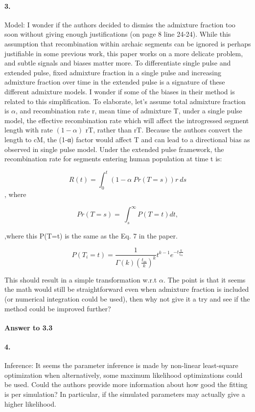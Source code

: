 \documentclass[11pt]{article}
\let\oldparagraph\paragraph
\renewcommand{\paragraph}[1]{\oldparagraph{#1}\mbox{}}
\begin{document}
\paragraph{3.}
Model: I wonder if the authors decided to dismiss the admixture fraction too soon without giving enough justifications (on page 8 line 24-24). While this assumption that recombination within archaic segments can be ignored is perhaps justifiable in some previous work, this paper works on a more delicate problem, and subtle signals and biases matter more. To differentiate single pulse and extended pulse, fixed admixture fraction in a single pulse and increasing admixture fraction over time in the extended pulse is a signature of these different admixture models. I wonder if some of the biases in their method is related to this simplification. To elaborate, let’s assume total admixture fraction is $\alpha$, and recombination rate r, mean time of admixture T, under a single pulse model, the effective recombination rate which will affect the introgressed segment length with rate $(1-\alpha)$ rT, rather than rT. Because the authors convert the length to cM, the (1-α) factor would affect T and can lead to a directional bias as observed in single pulse model. Under the extended pulse framework, the recombination rate for segments entering human population at time t is:


$$R(t) = \int_{0}^{t}{\left(1-\alpha\ Pr(T=s)\right)r\ ds}$$,
 where 

$$Pr\left(T=s\right)=\ \int_{s}^{\infty}P\left(T=t\right)dt,$$

,where this P(T=t) is the same as the Eq. 7 in the paper.
 
$$  P(T_i=t)=\frac{1}{\Gamma(k)(\frac{t_m}{k})^k}t^{k-1}e^{-t\frac{k}{t_m}}$$
 
This should result in a simple transformation w.r.t $\alpha$. The point is that it seems the math would still be straightforward even when admixture fraction is included (or numerical integration could be used), then why not give it a try and see if the method could be improved further?

\paragraph{Answer to 3.3}

\paragraph{4.}
Inference: It seems the parameter inference is made by non-linear least-square optimization when alternatively, some maximum likelihood optimizations could be used. Could the authors provide more information about how good the fitting is per simulation? In particular, if the simulated parameters may actually give a higher likelihood.
\end{document}
